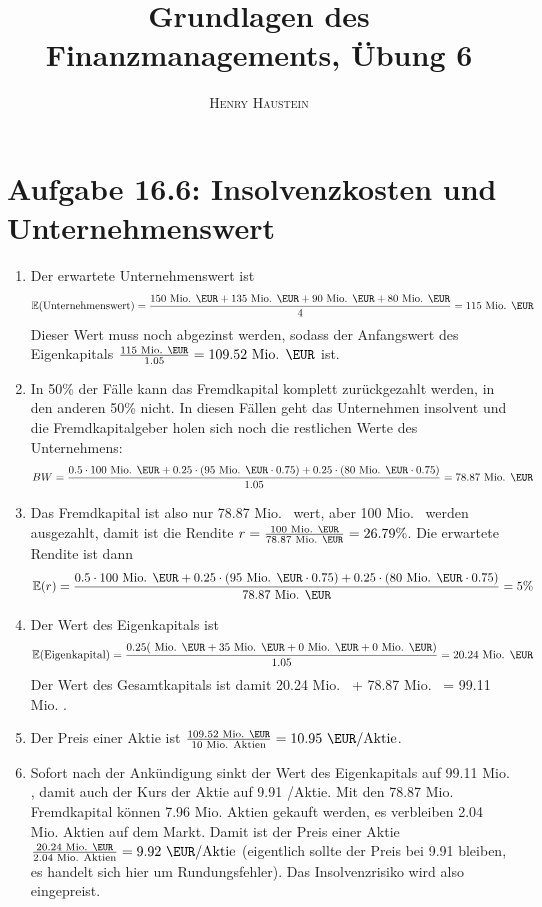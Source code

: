 \documentclass{article}
\title{\textbf{Grundlagen des Finanzmanagements, Übung 6}}
\author{\textsc{Henry Haustein}}
\date{}
\newcommand{\E}{\mathbb{E}}
\begin{document}
	\maketitle
	
	\section*{Aufgabe 16.6: Insolvenzkosten und Unternehmenswert}
	\begin{enumerate}[label=(\alph*)]
		\item Der erwartete Unternehmenswert ist
		\begin{align}
			\E(\text{Unternehmenswert}) = \frac{150\text{ Mio. \EUR} + 135\text{ Mio. \EUR} + 90\text{ Mio. \EUR} + 80\text{ Mio. \EUR}}{4} = 115\text{ Mio. \EUR} \notag
		\end{align}
		Dieser Wert muss noch abgezinst werden, sodass der Anfangswert des Eigenkapitals $\frac{115\text{ Mio. \EUR}}{1.05}=109.52\text{ Mio. \EUR}$ ist.
		\item In 50\% der Fälle kann das Fremdkapital komplett zurückgezahlt werden, in den anderen 50\% nicht. In diesen Fällen geht das Unternehmen insolvent und die Fremdkapitalgeber holen sich noch die restlichen Werte des Unternehmens:
		\begin{align}
			BW=\frac{0.5\cdot 100\text{ Mio. \EUR} + 0.25\cdot (95\text{ Mio. \EUR}\cdot 0.75) + 0.25\cdot (80\text{ Mio. \EUR}\cdot 0.75)}{1.05} = 78.87\text{ Mio. \EUR} \notag
		\end{align}
		\item Das Fremdkapital ist also nur 78.87 Mio. \EUR\, wert, aber 100 Mio. \EUR\, werden ausgezahlt, damit ist die Rendite $r=\frac{100\text{ Mio. \EUR}}{78.87\text{ Mio. \EUR}}=26.79\%$. Die erwartete Rendite ist dann
		\begin{align}
			\E(r) = \frac{0.5\cdot 100\text{ Mio. \EUR} + 0.25\cdot (95\text{ Mio. \EUR}\cdot 0.75) + 0.25\cdot (80\text{ Mio. \EUR}\cdot 0.75)}{78.87\text{ Mio. \EUR}} = 5\%\notag
		\end{align}
		\item Der Wert des Eigenkapitals ist
		\begin{align}
			\E(\text{Eigenkapital}) = \frac{0.25(\text{ Mio. \EUR} + 35\text{ Mio. \EUR} + 0\text{ Mio. \EUR} + 0\text{ Mio. \EUR})}{1.05} = 20.24\text{ Mio. \EUR} \notag
		\end{align}
		Der Wert des Gesamtkapitals ist damit 20.24 Mio. \EUR\, + 78.87 Mio. \EUR\, = 99.11 Mio. \EUR.
		\item Der Preis einer Aktie ist $\frac{109.52\text{ Mio. \EUR}}{10\text{ Mio. Aktien}} = 10.95\text{ \EUR/Aktie}$.
		\item Sofort nach der Ankündigung sinkt der Wert des Eigenkapitals auf 99.11 Mio. \EUR, damit auch der Kurs der Aktie auf 9.91 \EUR/Aktie. Mit den 78.87 Mio. \EUR\, Fremdkapital können 7.96 Mio. Aktien gekauft werden, es verbleiben 2.04 Mio. Aktien auf dem Markt. Damit ist der Preis einer Aktie $\frac{20.24\text{ Mio. \EUR}}{2.04\text{ Mio. Aktien}}=9.92\text{ \EUR/Aktie}$ (eigentlich sollte der Preis bei 9.91 bleiben, es handelt sich hier um Rundungsfehler). Das Insolvenzrisiko wird also eingepreist.
	\end{enumerate}
\end{document}
